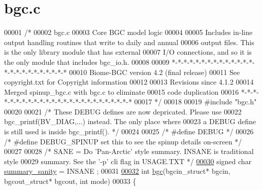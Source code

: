\hypertarget{bgc_8c_source}{}\section{bgc.\+c}
\label{bgc_8c_source}

\begin{DoxyCode}
00001 \textcolor{comment}{/*}
00002 \textcolor{comment}{bgc.c}
00003 \textcolor{comment}{Core BGC model logic}
00004 \textcolor{comment}{}
00005 \textcolor{comment}{Includes in-line output handling routines that write to daily and annual}
00006 \textcolor{comment}{output files. This is the only library module that has external}
00007 \textcolor{comment}{I/O connections, and so it is the only module that includes bgc\_io.h.}
00008 \textcolor{comment}{}
00009 \textcolor{comment}{*-*-*-*-*-*-*-*-*-*-*-*-*-*-*-*-*-*-*-*-*-*-*-*-*}
00010 \textcolor{comment}{Biome-BGC version 4.2 (final release)}
00011 \textcolor{comment}{See copyright.txt for Copyright information}
00012 \textcolor{comment}{}
00013 \textcolor{comment}{Revisions since 4.1.2}
00014 \textcolor{comment}{    Merged spinup\_bgc.c with bgc.c to eliminate}
00015 \textcolor{comment}{    code duplication}
00016 \textcolor{comment}{*-*-*-*-*-*-*-*-*-*-*-*-*-*-*-*-*-*-*-*-*-*-*-*-*}
00017 \textcolor{comment}{*/}
00018 
00019 \textcolor{preprocessor}{#include "bgc.h"}
00020 
00021 \textcolor{comment}{/* These DEBUG defines are now depricated. Please use }
00022 \textcolor{comment}{   bgc\_printf(BV\_DIAG,...) instead. The only place where }
00023 \textcolor{comment}{     a DEBUG define is still used is inside bgc\_printf(). */}
00024 
00025 \textcolor{comment}{/* #define DEBUG */}
00026 \textcolor{comment}{/* #define DEBUG\_SPINUP set this to see the spinup details on-screen */}
00027 
00028 \textcolor{comment}{/*  SANE = Do 'Pan-Arctic' style summary. INSANE is traditional style }
00029 \textcolor{comment}{        summary. See the '-p' cli flag in USAGE.TXT */}
\hypertarget{bgc_8c_source_l00030}{}\hyperlink{bgc_8c_ad321968d4dfc678d949b512629eefe6f}{00030} \textcolor{keywordtype}{signed} \textcolor{keywordtype}{char} \hyperlink{bgc_8c_ad321968d4dfc678d949b512629eefe6f}{summary\_sanity} = INSANE ;
00031 
\hypertarget{bgc_8c_source_l00032}{}\hyperlink{bgc_8c_aba68add8caf5b5d83c76c893d50f6626}{00032} \textcolor{keywordtype}{int} \hyperlink{bgc_8c_aba68add8caf5b5d83c76c893d50f6626}{bgc}(bgcin\_struct* bgcin, bgcout\_struct* bgcout, \textcolor{keywordtype}{int} mode)
00033 \{

\end{DoxyCode}
